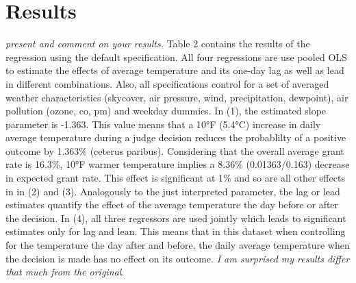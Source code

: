\documentclass[11pt]{article}
\begin{document}
	\section{Results}
	\textit{present and comment on your results.} \newline
	Table 2 contains the results of the regression using the default specification. All four regressions are use pooled OLS to estimate the effects of average temperature and its one-day lag as well as lead in different combinations. Also, all specifications control for a set of averaged weather characteristics (skycover, air pressure, wind, precipitation, dewpoint), air pollution (ozone, co, pm) and weekday dummies. 
	In (1), the estimated slope parameter is -1.363. This value means that a 10°F (5.4°C) increase in daily average temperature during a judge decision reduces the probablilty of a positive outcome by 1.363\% (ceterus paribus). Considering that the overall average grant rate is 16.3\%, 10°F warmer temperature implies a 8.36\% (0.01363/0.163) decrease in expected grant rate. This effect is significant at 1\% and so are all other effects in in (2) and (3). Analogously to the just interpreted parameter, the lag or lead estimates quantify the effect of the average temperature the day before or after the decision. In (4), all three regressors are used jointly which leads to significant estimates only for lag and lean. This means that in this dataset when controlling for the temperature the day after and before, the daily average temperature when the decision is made has no effect on its outcome. 
	\textit{I am surprised my results differ that much from the original.}	
	
\end{document}
